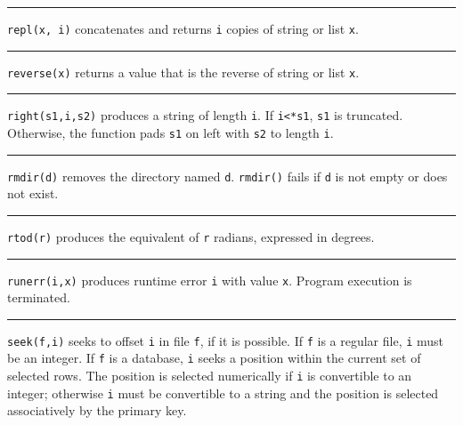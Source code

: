 \bigskip\hrule\vspace{0.1cm}

\noindent
{}\texttt{repl(x, i)} concatenates and returns
\texttt{i} copies of string or list \texttt{x}.

\bigskip\hrule\vspace{0.1cm}

\noindent
{}\texttt{reverse(x)} returns a value that is the
reverse of string or list \texttt{x}.

\bigskip\hrule\vspace{0.1cm}

\noindent
{}\texttt{right(s1,i,s2)} produces a string of length
\texttt{i}. If \texttt{i{\textless}*s1}, \texttt{s1} is truncated.
Otherwise, the function pads \texttt{s1} on left with \texttt{s2} to
length \texttt{i}.

\bigskip\hrule\vspace{0.1cm}

\noindent
{}\texttt{rmdir(d)} removes the directory named
\texttt{d}. \texttt{rmdir()} fails if \texttt{d} is not empty or does
not exist.

\bigskip\hrule\vspace{0.1cm}

\noindent
{}\texttt{rtod(r)} produces the
equivalent of \texttt{r} radians, expressed in degrees.

\bigskip\hrule\vspace{0.1cm}

\noindent
{}\texttt{runerr(i,x)} produces runtime error
\texttt{i} with value \texttt{x}. Program execution is terminated.

\bigskip\hrule\vspace{0.1cm}

\noindent
{}\texttt{seek(f,i)} seeks to offset \texttt{i} in file
\texttt{f}, if it is possible. If \texttt{f} is a regular file,
\texttt{i} must be an integer. If \texttt{f} is a database, \texttt{i}
seeks a position within the current set of selected rows. The position
is selected numerically if \texttt{i} is convertible to an integer;
otherwise \texttt{i} must be convertible to a string and the position
is selected associatively by the primary key.

